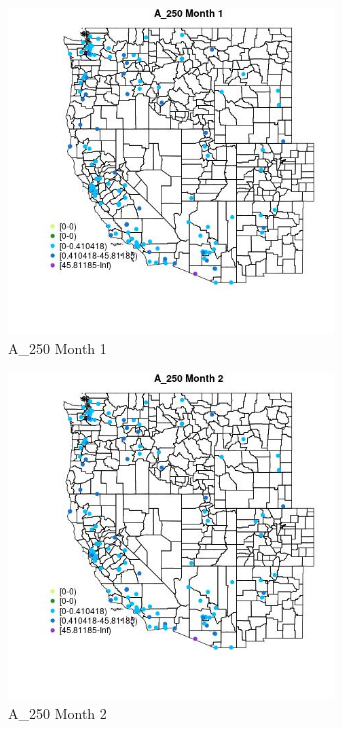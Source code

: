 \begin{figure} 
\centering  
\includegraphics[width=0.77\textwidth]{Code_Outputs/Report_ML_input_PM25_Step4_part_e_de_duplicated_aves_MapObsMo1A_250.jpg} 
\caption{\label{fig:Report_ML_input_PM25_Step4_part_e_de_duplicated_avesMapObsMo1A_250}A_250 Month 1} 
\end{figure} 
 

\clearpage 

\begin{figure} 
\centering  
\includegraphics[width=0.77\textwidth]{Code_Outputs/Report_ML_input_PM25_Step4_part_e_de_duplicated_aves_MapObsMo2A_250.jpg} 
\caption{\label{fig:Report_ML_input_PM25_Step4_part_e_de_duplicated_avesMapObsMo2A_250}A_250 Month 2} 
\end{figure} 
 


